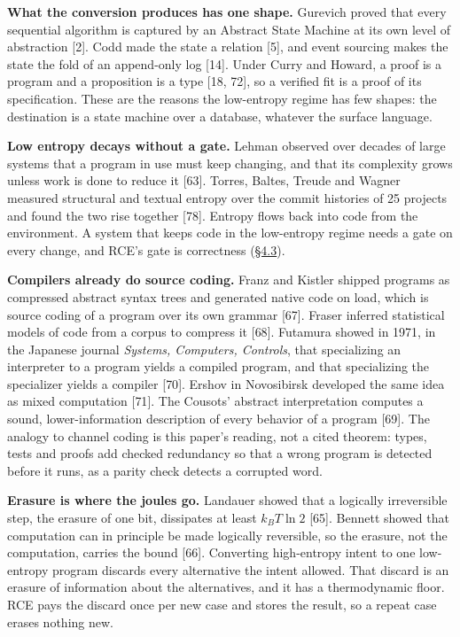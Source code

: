 \documentclass[10pt,letterpaper]{article}
\begin{document}
\textbf{What the conversion produces has one shape.} Gurevich proved
that every sequential algorithm is captured by an Abstract State Machine
at its own level of abstraction {[}2{]}. Codd made the state a relation
{[}5{]}, and event sourcing makes the state the fold of an append-only
log {[}14{]}. Under Curry and Howard, a proof is a program and a
proposition is a type {[}18, 72{]}, so a verified fit is a proof of its
specification. These are the reasons the low-entropy regime has few
shapes: the destination is a state machine over a database, whatever the
surface language.

\textbf{Low entropy decays without a gate.} Lehman observed over decades
of large systems that a program in use must keep changing, and that its
complexity grows unless work is done to reduce it {[}63{]}. Torres,
Baltes, Treude and Wagner measured structural and textual entropy over
the commit histories of 25 projects and found the two rise together
{[}78{]}. Entropy flows back into code from the environment. A system
that keeps code in the low-entropy regime needs a gate on every change,
and RCE's gate is correctness
(\href{https://research.openie.dev/papers/rce/\#43-the-gate}{§4.3}).

\textbf{Compilers already do source coding.} Franz and Kistler shipped
programs as compressed abstract syntax trees and generated native code
on load, which is source coding of a program over its own grammar
{[}67{]}. Fraser inferred statistical models of code from a corpus to
compress it {[}68{]}. Futamura showed in 1971, in the Japanese journal
\emph{Systems, Computers, Controls}, that specializing an interpreter to
a program yields a compiled program, and that specializing the
specializer yields a compiler {[}70{]}. Ershov in Novosibirsk developed
the same idea as mixed computation {[}71{]}. The Cousots' abstract
interpretation computes a sound, lower-information description of every
behavior of a program {[}69{]}. The analogy to channel coding is this
paper's reading, not a cited theorem: types, tests and proofs add
checked redundancy so that a wrong program is detected before it runs,
as a parity check detects a corrupted word.

\textbf{Erasure is where the joules go.} Landauer showed that a
logically irreversible step, the erasure of one bit, dissipates at least
\(k_B T \ln 2\) {[}65{]}. Bennett showed that computation can in
principle be made logically reversible, so the erasure, not the
computation, carries the bound {[}66{]}. Converting high-entropy intent
to one low-entropy program discards every alternative the intent
allowed. That discard is an erasure of information about the
alternatives, and it has a thermodynamic floor. RCE pays the discard
once per new case and stores the result, so a repeat case erases nothing
new.
\end{document}
